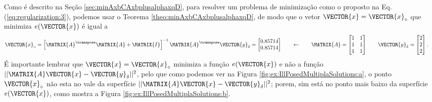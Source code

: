 \begin{SolutionT}
\label{sol:IllPosedMultiplaSolutions}
Como é descrito na Seção \ref{sec:minAxbCAxbplusalphaxqD}, para resolver um problema de minimização como o proposto na Eq. (\ref{eq:regularization:3}),
podemos usar o Teorema \ref{theo:minAxbCAxbplusalphaxqD}, de modo que o vetor $\VECTOR{x}=\VECTOR{x}_{\circ}$ que minimiza $e(\VECTOR{x})$
é igual a
\begin{equation}\label{eq:regularization:4b}
\VECTOR{x}_{\circ} =
\left[ \MATRIX{A}^{\transpose}\MATRIX{A} +\MATRIX{I}\right]^{-1} \MATRIX{A}^{\transpose} \VECTOR{y}_{\delta}
=
\begin{bmatrix}
0.85714\\
0.85714
\end{bmatrix}
\qquad \leftarrow \qquad
\MATRIX{A}=
\begin{bmatrix}
1 & 1\\
1 & 1\\
1 & 1
\end{bmatrix}
\qquad
\VECTOR{y}_{\delta}=
\begin{bmatrix}
2\\
2\\
2
\end{bmatrix}.
\end{equation}
É importante lembrar que $\VECTOR{x}=\VECTOR{x}_{\circ}$ minimiza a função $e(\VECTOR{x})$ e não
a função $||\MATRIX{A}\VECTOR{x}-\VECTOR{y}_{\delta}||^2$,
pelo que como podemos ver na Figura \ref{fig:ex:IllPosedMultiplaSolutions:a},
o ponto $\VECTOR{x}_{\circ}$ não esta no vale da superfície $||\MATRIX{A}\VECTOR{x}-\VECTOR{y}_{\delta}||^2$;
porem, sim está no ponto mais baixo da superfície $e(\VECTOR{x})$, como mostra a Figura \ref{fig:ex:IllPosedMultiplaSolutions:b}.
\end{SolutionT}

